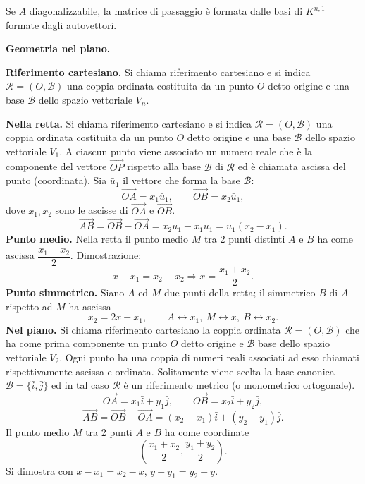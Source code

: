 \documentclass[11pt,a4paper]{article}
\newcommand{\pagina}[1]{\clearpage}
\begin{document}
Se $A$ diagonalizzabile, la matrice di passaggio è formata dalle basi di $K^{n,1}$ formate dagli autovettori.

\pagina{56}
\textbf{Geometria nel piano.}

\textbf{Riferimento cartesiano.} Si chiama riferimento cartesiano e si indica $\mathcal R=(O,\mathcal B)$ una coppia ordinata costituita da un punto $O$ detto origine e una base $\mathcal B$ dello spazio vettoriale $V_n$.

\textbf{Nella retta.} Si chiama riferimento cartesiano e si indica $\mathcal R=(O,\mathcal B)$ una coppia ordinata costituita da un punto $O$ detto origine e una base $\mathcal B$ dello spazio vettoriale $V_1$.
A ciascun punto viene associato un numero reale che è la componente del vettore $\overrightarrow{OP}$ rispetto alla base $\mathcal B$ di $\mathcal R$ ed è chiamata ascissa del punto (coordinata).
Sia $\bar u_1$ il vettore che forma la base $\mathcal B$:
\[\overrightarrow{OA}=x_1\bar u_1,\qquad\overrightarrow{OB}=x_2\bar u_1,\]
dove $x_1,x_2$ sono le ascisse di $\overrightarrow{OA}$ e $\overrightarrow{OB}$.
\[\overrightarrow{AB}=\overrightarrow{OB}-\overrightarrow{OA}=x_2\bar u_1-x_1\bar u_1=\bar u_1(x_2-x_1).\]
\textbf{Punto medio.} Nella retta il punto medio $M$ tra 2 punti distinti $A$ e $B$ ha come ascissa $\dfrac{x_1+x_2}{2}$.
Dimostrazione:
\[x-x_1=x_2-x_2\Longrightarrow x=\frac{x_1+x_2}{2}.\]
\pagina{57}
\textbf{Punto simmetrico.} Siano $A$ ed $M$ due punti della retta; il simmetrico $B$ di $A$ rispetto ad $M$ ha ascissa
\[x_2=2x-x_1,\qquad A\leftrightarrow x_1,\ M\leftrightarrow x,\ B\leftrightarrow x_2.\]
\textbf{Nel piano.} Si chiama riferimento cartesiano la coppia ordinata $\mathcal R=(O,\mathcal B)$ che ha come prima componente un punto $O$ detto origine e $\mathcal B$ base dello spazio vettoriale $V_2$.
Ogni punto ha una coppia di numeri reali associati ad esso chiamati rispettivamente ascissa e ordinata.
Solitamente viene scelta la base canonica $\mathcal B=\{\bar i,\bar j\}$ ed in tal caso $\mathcal R$ è un riferimento metrico (o monometrico ortogonale).
\[\overrightarrow{OA}=x_1\bar i+y_1\bar j,\qquad\overrightarrow{OB}=x_2\bar i+y_2\bar j,\]
\[\overrightarrow{AB}=\overrightarrow{OB}-\overrightarrow{OA}=(x_2-x_1)\bar i+(y_2-y_1)\bar j.\]
Il punto medio $M$ tra 2 punti $A$ e $B$ ha come coordinate
\[\left(\frac{x_1+x_2}{2},\frac{y_1+y_2}{2}\right).\]
Si dimostra con $x-x_1=x_2-x$, $y-y_1=y_2-y$.
\end{document}
